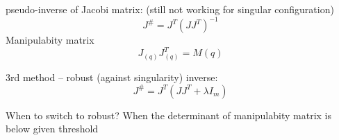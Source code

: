 \documentclass[12pt, a4paper]{extarticle}
\begin{document}
	pseudo-inverse of Jacobi matrix: (still not working for singular configuration)
	\begin{equation}\label{key}
		J^\# = J^T(J J^T)^{-1}
	\end{equation}
	Manipulabity matrix
	\begin{equation}\label{key}
		J_{(q)} J^T_{(q)} = M(q)
	\end{equation}

	3rd method -- robust (against singularity) inverse:
	\begin{equation}\label{key}
		J^\# = J^T(J J^T + \lambda I_m)
	\end{equation}

	When to switch to robust? When the determinant of manipulabity matrix is below given threshold
\end{document}
